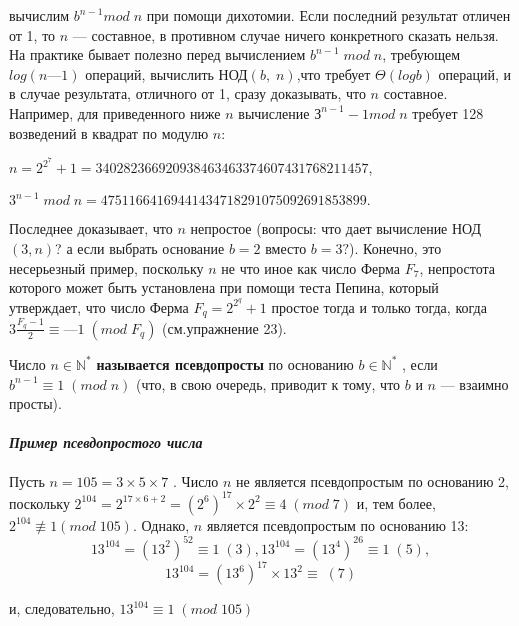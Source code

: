 \documentclass{mai_book}
\begin{document}
  	
  	\noindent
  	вычислим $b^{n-1} mod\;n$ при помощи дихотомии. Если последний результат отличен от 1, то $n$ — составное, в противном случае ничего конкретного сказать нельзя. На практике бывает полезно перед вычислением $b^{n-1}\;mod\;n$, требующем $log(n— 1)$ операций, вычислить НОД$(b,\;n)$,что требует $\varTheta(logb)$ операций, и в случае результата, отличного от 1,
  	сразу доказывать, что $n$ составное. Например, для приведенного ниже $n$ вычисление $З^{n-1}- 1 mod\;n$ требует 128 возведений в квадрат по модулю $n$:
  	\begin{center}
  		$n=2^{2^{7}}+1=340 282 366 920 938 463 463 374 607 431768 211457$,
  		
  		$3^{n-1}\;mod\;n=47 511664169 441434 718 291075 092 691853 899.$
  	\end{center}
  	\noindent
  	Последнее доказывает, что $n$ непростое (вопросы: что дает вычисление НОД$(3,n)$? а если выбрать основание $b = 2$ вместо $b = 3?$). Конечно,  это несерьезный пример, поскольку $n$ не что иное как число Ферма  $F_7$, непростота которого может быть установлена при помощи теста  Пепина, который утверждает, что число Ферма $F_q=2^{2^{q}}+1$ простое  тогда и только тогда, когда $3\frac{F_q-1}{2}\equiv —1\;(mod\;F_q)$ (см.упражнение 23).
  	\begin{determ}
  	\noindent
  	
  	Число $n \in \mathbb N^{*}$ {\bf называется псевдопросты}  по основанию $b \in \mathbb N^{*}$ ,	если $b^{n-1} \equiv 1\;(mod\;n)$ (что, в свою очередь, приводит к тому, что $b$ и $n$ — взаимно просты).
  	\end{determ}
  	\paragraph{{\it Пример псевдопростого числа}}
  	\noindent
  	
  	Пусть $n=105 = 3\times5\times7$ . Число $n$ не является псевдопростым по основанию 2, поскольку $2^104 = 2^{17\times6+2}= (2^6)^{17} \times 2^2 \equiv 4\;(mod\;7)$
  	и, тем более, $2^{104} \not\equiv 1 (mod\;105)$. Однако, $n$ является псевдопростым по основанию 13:
  	\begin{equation}
  	13^{104}=(13^2)^{52}\equiv 1\;(3), 13^104=(13^4)^{26} \equiv 1\;(5),
  	\end{equation}
  	\begin{equation}
  	 13^{104} = (13^6)^{17}\times 13^2 \equiv \;(7)
  	\end{equation}

  	
  	и, следовательно, $13^{104} \equiv 1\;(mod\;105)$
  	
\end{document}
